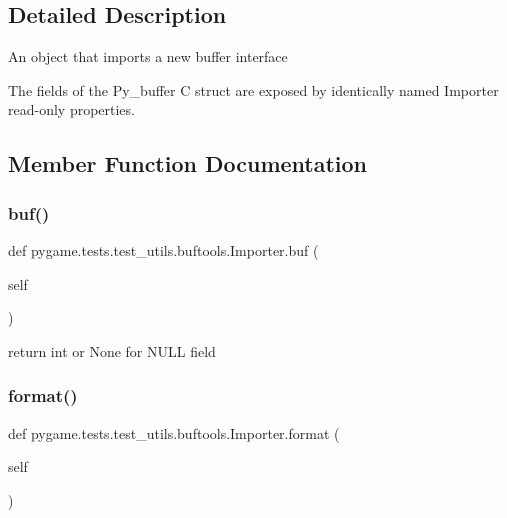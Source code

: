 \subsection{Detailed Description}
\begin{DoxyVerb}An object that imports a new buffer interface

   The fields of the Py_buffer C struct are exposed by identically
   named Importer read-only properties.
\end{DoxyVerb}
 

\subsection{Member Function Documentation}
\mbox{\label{classpygame_1_1tests_1_1test__utils_1_1buftools_1_1_importer_ab0cae2f8dc5038d615cc76bebb09adca}} 
\subsubsection{\texorpdfstring{buf()}{buf()}}
{\footnotesize\ttfamily def pygame.\+tests.\+test\+\_\+utils.\+buftools.\+Importer.\+buf (\begin{DoxyParamCaption}\item[{}]{self }\end{DoxyParamCaption})}

\begin{DoxyVerb}return int or None for NULL field\end{DoxyVerb}
 \mbox{\label{classpygame_1_1tests_1_1test__utils_1_1buftools_1_1_importer_a0616a9962fab24dcbf698472b4de9e00}} 
\subsubsection{\texorpdfstring{format()}{format()}}
{\footnotesize\ttfamily def pygame.\+tests.\+test\+\_\+utils.\+buftools.\+Importer.\+format (\begin{DoxyParamCaption}\item[{}]{self }\end{DoxyParamCaption})}

